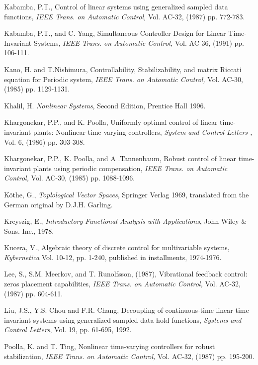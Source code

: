 \begin{thebibliography}{99}

Kabamba, P.T., Control of linear systems using
generalized sampled data functions, {\em IEEE Trans. on Automatic Control,}
Vol. AC-32, (1987) pp. 772-783.

Kabamba, P.T., and  C. Yang, Simultaneous  Controller Design  for  Linear
Time-Invariant Systems, {\em IEEE Trans. on Automatic Control,} Vol. AC-36, (1991)
pp. 106-111.


Kano, H. and T.Nishimura, Controllability, Stabilizability, and  matrix Riccati
equation for Periodic system, {\em IEEE Trans. on Automatic Control,} Vol. AC-30,
(1985) pp. 1129-1131.

Khalil, H.  {\em Nonlinear  Systems}, Second Edition, Prentice  Hall
 1996.

Khargonekar, P.P., and K. Poolla, Uniformly optimal control of  linear
time-invariant plants: Nonlinear  time  varying  controllers, {\em
System  and  Control Letters ,} Vol. 6, (1986) pp. 303-308.

Khargonekar, P.P., K. Poolla, and A .Tannenbaum,
Robust control of linear time-invariant plants using periodic compensation,  {\em
IEEE Trans. on Automatic Control,} Vol. AC-30, (1985) pp. 1088-1096.


K\"{o}the, G.,  {\em Toplological  Vector  Spaces}, Springer  Verlag
1969, translated  from  the  German original by D.J.H. Garling.


Kreyszig, E., {\em
Introductory Functional Analysis with Applications}, John Wiley \&
Sons. Inc., 1978.

 Kucera, V., Algebraic theory of discrete control for
multivariable systems, {\em Kybernetica} Vol. 10-12, pp. 1-240, published in
installments, 1974-1976.

Lee, S., S.M. Meerkov, and T. Runolfsson, (1987), Vibrational
 feedback control: zeros placement capabilities,  {\em IEEE Trans. on
Automatic Control,} Vol. AC-32, (1987) pp. 604-611.


Liu, J.S., Y.S. Chou and  F.R. Chang, Decoupling  of continuous-time linear
time  invariant systems using generalized sampled-data hold functions, {\em Systems
and Control Letters}, Vol. 19, pp. 61-695, 1992.

Poolla, K. and T. Ting, Nonlinear time-varying controllers
for robust stabilization, {\em IEEE Trans. on Automatic
Control,} Vol. AC-32, (1987) pp. 195-200.



\end{thebibliography}
